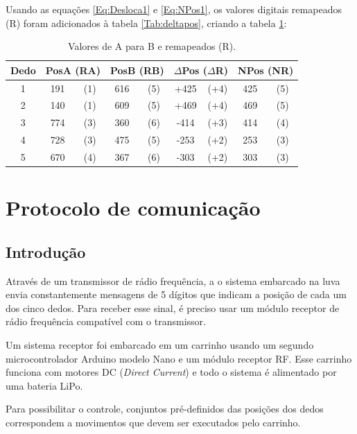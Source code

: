 \documentclass[
	12pt,				%
	openright,			%
	oneside,			%
	a4paper,			%
	english,			%
	brazil				%
	]{abntex2}
\begin{document}
	 Usando as equações \ref{Eq:Desloca1} e \ref{Eq:NPos1}, os valores digitais remapeados (R) foram adicionados à tabela \ref{Tab:deltapos}, criando a tabela \ref{Tab:deltaremap}:


	\begin{table}[H]
  	\centering
		\caption{Valores de A para B e remapeados (R).}
    \begin{tabular}{c|cc|cc|cc|cc}
      \midrule
			Dedo	&\multicolumn{2}{c}{PosA	(RA)} 	&\multicolumn{2}{c}{PosB (RB)}	&\multicolumn{2}{c}{$\Delta$Pos	($\Delta$R)}	&\multicolumn{2}{c}{NPos	(NR)}	\\
      \midrule
			1 		& 191 & (1)		& 616 & (5)		& 		+425 & (+4)		&			425	& (5)		\\
			2 		& 140 & (1)		& 609 & (5)		& 		+469 & (+4)		&			469 &	(5)		\\
			3 		& 774 & (3)		& 360 & (6)		& 		-414 & (+3)		&			414	& (4)		\\
			4 		& 728 & (3)		& 475 & (5)		& 		-253 & (+2)		&			253	& (3)		\\
			5 		& 670 & (4)		& 367 & (6)		& 		-303 & (+2)		&			303 &	(3)		\\      
      \midrule
    \end{tabular}
    \label{Tab:deltaremap}
	\end{table}
	

		
		\section{Protocolo de comunicação}

		\subsection{Introdução}

		Através de um transmissor de rádio frequência, a o sistema embarcado na luva envia constantemente mensagens de 5 dígitos que indicam a posição de cada um dos cinco dedos. Para receber esse sinal, é preciso usar um módulo receptor de rádio frequência compatível com o transmissor. 
		
		Um sistema receptor foi embarcado em um carrinho usando um segundo microcontrolador Arduino modelo Nano e um módulo receptor RF. Esse carrinho funciona com motores DC (\textit{Direct Current}) e todo o sistema é alimentado por uma bateria LiPo. 

		Para possibilitar o controle, conjuntos pré-definidos das posições dos dedos correspondem a movimentos que devem ser executados pelo carrinho.
		
\end{document}
